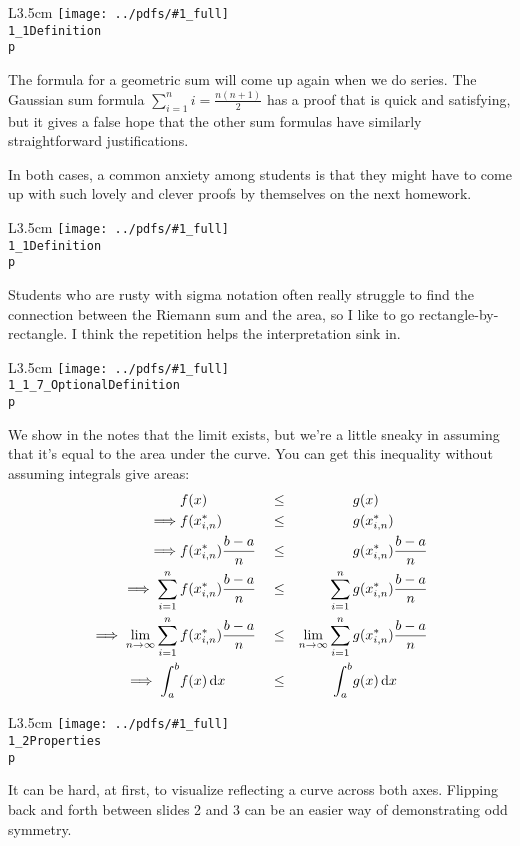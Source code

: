 \documentclass{beamer}
\newcommand{\notefig}[3]{%
	\begin{wrapfigure}{L}{3.5cm}
	\texttt{[image: ../pdfs/\#1\_full]}\\
	\footnotesize
	\texttt{#2}\\
	 \texttt{p \pageref{#3}}
	\end{wrapfigure}
	}
\begin{document}
%
\begin{frame}
\notefig{1_1Definition}{1\_1Definition}{note1.1b}

The formula for a geometric sum will come up again when we do series. The Gaussian sum formula $\sum_{i=1}^n i=\frac{n(n+1)}{2}$ has a proof that is quick and satisfying, but it gives a false hope that the other sum formulas have similarly straightforward justifications.\vfill

In both cases, a common anxiety among students is that they might have to come up with such lovely and clever proofs by themselves on the next homework.

\end{frame}
%
\begin{frame}
\notefig{1_1Definition}{1\_1Definition}{note1.1c}

Students who are rusty with sigma notation often really struggle to find the connection between the Riemann sum and the area, so I like to go rectangle-by-rectangle. I think the repetition helps the interpretation sink in.

\end{frame}
%
\begin{frame}
\notefig{1_1_7OptionalDefinition}{1\_1\_7\_OptionalDefinition}{note1.1.7}

We show in the notes that the limit exists, but we're a little sneaky in assuming that it's equal to the area under the curve. You can get this inequality without assuming integrals give areas:\\

\footnotesize
\begin{alignat*}{3}
&f(x)&& \le &&g(x)\\
\implies &f(x_{i,n}^*)&& \le& &g(x_{i,n}^*)\\
\implies &f(x_{i,n}^*)\frac{b-a}{n}&& \le& &g(x_{i,n}^*)\frac{b-a}{n}\\
\implies \sum_{i=1}^n\,&f(x_{i,n}^*)\frac{b-a}{n}&&\le& \sum_{i=1}^n\, &g(x_{i,n}^*)\frac{b-a}{n}\\
\implies \lim_{n \to \infty}\sum_{i=1}^n\,&f(x_{i,n}^*)\frac{b-a}{n}&&\le& \lim_{n \to\infty}\sum_{i=1}^n\, &g(x_{i,n}^*)\frac{b-a}{n}\\
\implies \int_a^b &f(x)\,\text{d} x &&\le & \int_a^b&g(x)\,\text{d} x
\end{alignat*}
\end{frame}
%
\begin{frame}
\notefig{1_2Properties}{1\_2Properties}{note1.2a}

It can be hard, at first, to visualize reflecting a curve across both axes. Flipping back and forth between slides 2 and 3 can be an easier way of demonstrating odd symmetry.
\end{frame}
\end{document}
